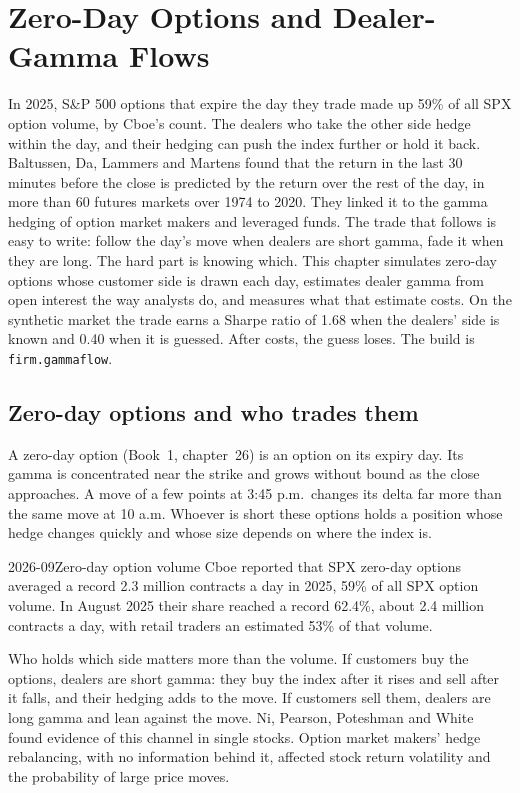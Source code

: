 \chapter{Zero-Day Options and Dealer-Gamma Flows}\label{ch:s2:zero-day-options-and-dealer-gamma-flows}

In 2025, S\&P 500 options that expire the day they trade made up 59\% of all SPX option volume, by Cboe's count. The dealers who take the other side
hedge within the day, and their hedging can push the index further or hold it back. Baltussen, Da, Lammers and Martens found that the return in the
last 30 minutes before the close is predicted by the return over the rest of the day, in more than 60 futures markets over 1974 to 2020. They linked it
to the gamma hedging of option market makers and leveraged funds. The trade that follows is easy to write: follow the day's move when dealers are
short gamma, fade it when they are long. The hard part is knowing which. This chapter simulates zero-day options whose customer side is drawn each day,
estimates dealer gamma from open interest the way analysts do, and measures what that estimate costs. On the synthetic market the trade earns a Sharpe
ratio of 1.68 when the dealers' side is known and 0.40 when it is guessed. After costs, the guess loses. The build is \texttt{firm.gammaflow}.

\section{Zero-day options and who trades them}

A zero-day option (Book~1, chapter~26) is an option on its expiry day. Its gamma is concentrated near the strike and grows without bound as the close
approaches. A move of a few points at 3:45 p.m.\ changes its delta far more than the same move at 10 a.m. Whoever is short these options holds a
position whose hedge changes quickly and whose size depends on where the index is.

\begin{dated}{2026-09}{Zero-day option volume}\label{dat:s2:zero-day-options-and-dealer-gamma-flows:volume}
Cboe reported that SPX zero-day options averaged a record 2.3 million contracts a day in 2025, 59\% of all SPX option volume. In August 2025 their
share reached a record 62.4\%, about 2.4 million contracts a day, with retail traders an estimated 53\% of that volume.
\end{dated}

Who holds which side matters more than the volume. If customers buy the options, dealers are short gamma: they buy the index after it rises and sell
after it falls, and their hedging adds to the move. If customers sell them, dealers are long gamma and lean against the move. Ni, Pearson, Poteshman
and White found evidence of this channel in single stocks. Option market makers' hedge rebalancing, with no information behind it, affected stock
return volatility and the probability of large price moves.

